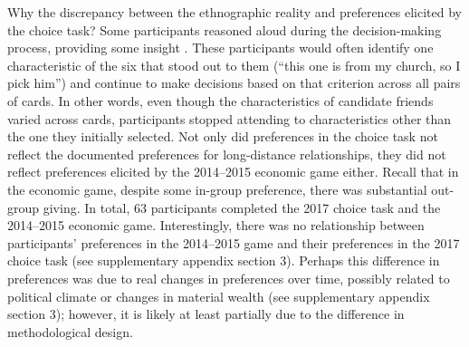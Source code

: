\documentclass[bibauthoryear]{aa}
\begin{document}
	Why the discrepancy between the ethnographic reality and preferences elicited by the choice task? Some participants reasoned aloud during the decision-making process, providing some insight \citep{bernard2017research}. These participants would often identify one characteristic of the six that stood out to them (``this one is from my church, so I pick him'') and continue to make decisions based on that criterion across all pairs of cards. In other words, even though the characteristics of candidate friends varied across cards, participants stopped attending to characteristics other than the one they initially  selected. Not only did preferences in the choice task not reflect the documented preferences for long-distance relationships,  they did not reflect preferences elicited by the 2014--2015 economic game either. Recall that in the economic game, despite some in-group preference, there was substantial out-group giving. In total, 63 participants completed the 2017 choice task and the 2014--2015 economic game. Interestingly, there was no relationship between participants' preferences in the 2014--2015 game and their preferences in the 2017 choice task (see supplementary appendix section 3). Perhaps this difference in preferences was due to real changes in preferences over time, possibly related to political climate or changes in material wealth (see supplementary appendix section 3); however, it is likely at least partially due to the difference in methodological design.
	
\end{document}
